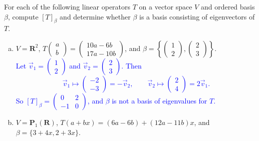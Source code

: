 \documentclass[a4paper,11pt]{article}
\newcommand{\R}{\mathbf{R}}
\newcommand{\PP}{\mathbf{P}}
\newcommand{\blue}[1]{\textcolor{blue}{#1}}
\begin{document}
 For each of the following linear operators $T$ on
a vector space $V$ and ordered basis $\beta$, compute $[T]_\beta$ and determine
whether $\beta$ is a basis consisting of eigenvectors of $T$.
\begin{enumerate}[(a)]
\item $V=\R^2$,
  $T\left( \begin{smallmatrix}a\\b\end{smallmatrix} \right)=
  \left( \begin{smallmatrix}10a-6b\\17a-10b\end{smallmatrix} \right)$,
  and
  $\beta=\left\{ \left( \begin{smallmatrix}1\\2\end{smallmatrix} \right),
    \left( \begin{smallmatrix}2\\3\end{smallmatrix} \right)\right\}$. \\

  \blue{Let $\vec v_1=\left( \begin{smallmatrix}1\\2\end{smallmatrix} \right)$
    and $\vec v_2=\left( \begin{smallmatrix}2\\3\end{smallmatrix} \right)$. Then
    \[
      \vec v_1 \mapsto
      \left(
        \begin{array}{r}
          -2\\-3
        \end{array}
      \right) = -\vec v_2, \qquad
      \vec v_2 \mapsto
      \left(
        \begin{array}{r}
          2\\4
        \end{array}
      \right) = 2\vec v_1.
    \]
    So $[T]_\beta = \left( \begin{smallmatrix}0&2\\-1&0\end{smallmatrix}
    \right)$, and $\beta$ is not a basis of eigenvalues for $T$. \\}

\item $V=\PP_1(\R)$, $T(a+bx)=(6a-6b)+(12a-11b)x$, and $\beta=\{3+4x, 2+3x\}$.
  \\


\end{enumerate}
\end{document}
